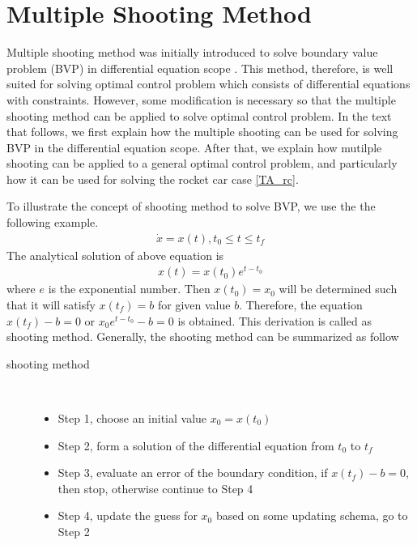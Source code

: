 \section{Multiple Shooting Method}
Multiple shooting method was initially introduced to solve boundary value problem (BVP) in differential equation scope \cite{DJJ62}. This method, therefore, is well suited for solving optimal control problem which consists of differential equations with constraints. However, some modification is necessary so that the multiple shooting method can be applied to solve optimal control problem. In the text that follows, we first explain how the multiple shooting can be used for solving BVP in the differential equation scope. After that, we explain how mutilple shooting can be applied to a general optimal control problem, and particularly how it can be used for solving the rocket car case \ref{TA_rc}.

To illustrate the concept of shooting method to solve BVP, we use the the following example.
\begin{align*}
	\dot{x} = x(t), t_0 \leq t \leq t_f	
\end{align*}
The analytical solution of above equation is 
\begin{align*}
x(t) = x(t_0)e^{t - t_0}
\end{align*}
where $e$ is the exponential number. Then $x(t_0) = x_0$ will be determined such that it will satisfy
$x(t_f)=b$ for given value $b$. Therefore, the equation $x(t_f)-b = 0$ or $x_0e^{t - t_0}-b =0$ is obtained. This derivation is called as shooting method. Generally, the shooting method can be summarized as follow
\begin{description}
	\item[shooting method] \
	\begin{itemize}
		\item Step 1, choose an initial value $x_0 = x(t_0)$ 
		\item Step 2, form a solution of the differential equation from $t_0$ to $t_f$
		\item Step 3, evaluate an error of the boundary condition, if $x(t_f) - b = 0$, then stop, otherwise continue to Step 4 
		\item Step 4, update the guess for $x_0$ based on some updating schema, go to Step 2
	\end{itemize}
\end{description}

